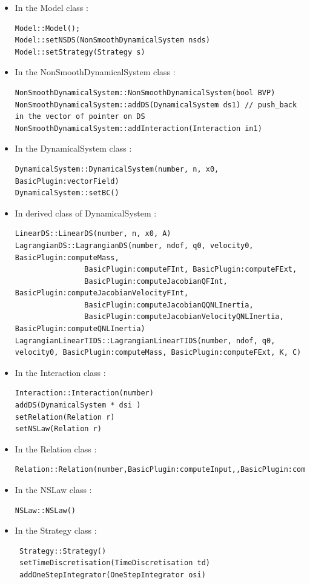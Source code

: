  \begin{itemize}
 \item In the Model class :
\begin{verbatim}
Model::Model();
Model::setNSDS(NonSmoothDynamicalSystem nsds)
Model::setStrategy(Strategy s)
\end{verbatim}

 \item In the NonSmoothDynamicalSystem class :

\begin{verbatim}
NonSmoothDynamicalSystem::NonSmoothDynamicalSystem(bool BVP)
NonSmoothDynamicalSystem::addDS(DynamicalSystem ds1) // push_back in the vector of pointer on DS
NonSmoothDynamicalSystem::addInteraction(Interaction in1) 
\end{verbatim}
        
        \item In the DynamicalSystem class :
\begin{verbatim}
DynamicalSystem::DynamicalSystem(number, n, x0, BasicPlugin:vectorField)
DynamicalSystem::setBC()
\end{verbatim}
          \item In derived class of DynamicalSystem :
\begin{verbatim}
LinearDS::LinearDS(number, n, x0, A)
LagrangianDS::LagrangianDS(number, ndof, q0, velocity0, BasicPlugin:computeMass,
                BasicPlugin:computeFInt, BasicPlugin:computeFExt,
                BasicPlugin:computeJacobianQFInt, BasicPlugin:computeJacobianVelocityFInt,
                BasicPlugin:computeJacobianQQNLInertia,
                BasicPlugin:computeJacobianVelocityQNLInertia, BasicPlugin:computeQNLInertia)
LagrangianLinearTIDS::LagrangianLinearTIDS(number, ndof, q0, velocity0, BasicPlugin:computeMass, BasicPlugin:computeFExt, K, C)
\end{verbatim}

   
          \item In the Interaction class :
\begin{verbatim}
Interaction::Interaction(number)
addDS(DynamicalSystem * dsi )
setRelation(Relation r)
setNSLaw(Relation r)
\end{verbatim}
          \item In the Relation class :
\begin{verbatim}
Relation::Relation(number,BasicPlugin:computeInput,,BasicPlugin:computeOutput)
\end{verbatim}
          \item In the NSLaw class :
\begin{verbatim}
NSLaw::NSLaw()
\end{verbatim}
 \item In the Strategy class :
 \begin{verbatim}
 Strategy::Strategy()
 setTimeDiscretisation(TimeDiscretisation td)
 addOneStepIntegrator(OneStepIntegrator osi)     
 \end{verbatim}
        
\end{itemize}


